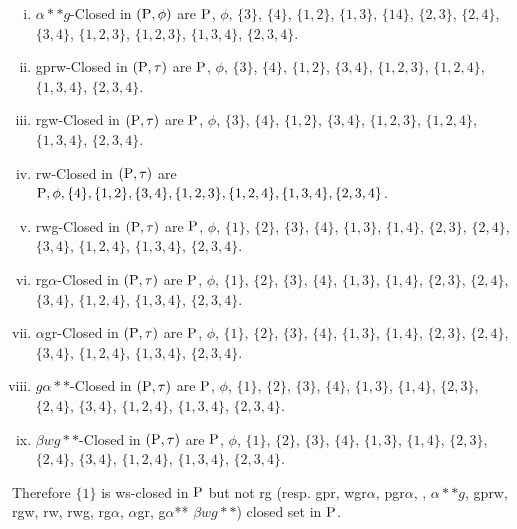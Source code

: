 \begin{exm}
\begin{enumerate}[(i)]
\item $\alpha {*}{*} g$-Closed in $(\mathrm{P}, \phi)$ are $\mathrm{P}$, $\phi$, $\{3\}$, $\{4\}$, $\{1, 2\}$, $\{1, 3\}$, $\{1 4\}$, $\{2, 3\}$, $\{2, 4\}$, $\{3, 4\}$, $\{1, 2,3\}$, $\{1, 2, 3\}$, $\{1, 3, 4\}$, $\{2, 3, 4\}$.

\item gprw-Closed in $(\mathrm{P}, \tau)$ are $\mathrm{P}$, $\phi$, $\{3\}$, $\{4\}$, $\{1, 2\}$, $\{3, 4\}$, $\{1, 2, 3\}$, $\{1, 2, 4\}$, $\{1, 3, 4\}$, $\{2, 3,4\}$.

\item rgw-Closed in $(\mathrm{P}, \tau)$ are $\mathrm{P}$, $\phi$, $\{3\}$, $\{4\}$, $\{1, 2\}$, $\{3, 4\}$, $\{1, 2, 3\}$, $\{1, 2, 4\}$, $\{1, 3, 4\}$, $\{2, 3, 4\}$.

\item rw-Closed in $(\mathrm{P}, \tau)$ are $\mathrm{P}, \phi,\{4\},\{1, 2\},\{3, 4\},\{1, 2, 3\},\{1, 2, 4\},\{1, 3, 4\},\{2, 3, 4\}$.

\item rwg-Closed in $(\mathrm{P}, \tau)$ are $\mathrm{P}$, $ \phi$, $\{1\}$, $\{2\}$, $\{3\}$, $\{4\}$, $\{1,  3\}$, $\{1, 4\}$, $\{2, 3\}$, $\{2, 4\}$, $\{3, 4\}$, $\{1, 2, 4\}$, $\{1, 3, 4\}$, $\{2, 3, 4\}$.

\item rg$\alpha$-Closed in $(\mathrm{P}, \tau)$ are $\mathrm{P}$, $ \phi$, $\{1\}$, $\{2\}$, $\{3\}$, $\{4\}$, $\{1, 3\}$, $\{1, 4\}$, $\{2, 3\}$, $\{2, 4\}$, $\{3, 4\}$, $ \{1, 2, 4\}$, $ \{1, 3, 4\}$, $\{2, 3, 4\}$.

\item $\alpha$gr-Closed in $(\mathrm{P}, \tau)$ are $\mathrm{P}$, $ \phi$, $\{1\}$, $\{2\}$, $\{3\}$, $\{4\}$, $\{1, 3\}$, $\{1, 4\}$, $\{2, 3\}$, $\{2, 4\}$, $\{3, 4\}$, $ \{1, 2, 4\}$, $ \{1, 3, 4\}$, $\{2, 3, 4\}$.

\item $g\alpha {*}{*}$-Closed in $(\mathrm{P}, \tau)$ are $\mathrm{P}$, $ \phi$, $\{1\}$, $\{2\}$, $\{3\}$, $\{4\}$, $\{1, 3\}$, $\{1, 4\}$, $\{2, 3\}$, $\{2, 4\}$, $\{3, 4\}$, $ \{1, 2, 4\}$, $ \{1, 3, 4\}$, $\{2, 3, 4\}$.

\item $\beta wg{*}{*}$-Closed in $(\mathrm{P}, \tau)$ are $\mathrm{P}$, $ \phi$, $\{1\}$, $\{2\}$, $\{3\}$, $\{4\}$, $\{1, 3\}$, $\{1, 4\}$, $\{2, 3\}$, $\{2, 4\}$, $\{3, 4\}$, $ \{1, 2, 4\}$, $ \{1, 3, 4\}$, $\{2, 3, 4\}$.
\end{enumerate}
\end{exm}

Therefore $\{1\}$ is ws-closed in $\mathrm{P}$ but not rg (resp. gpr, wgr$\alpha$, pgr$\alpha$, , $\alpha {*}{*}g$, gprw, rgw, rw, rwg, rg$\alpha$, $\alpha$gr, g$\alpha${*}{*} $\beta wg{*}{*}$) closed set in $\mathrm{P}$.

